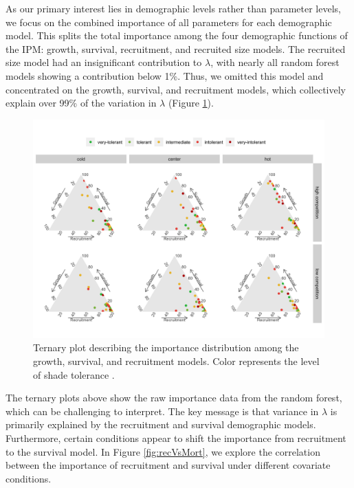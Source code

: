 As our primary interest lies in demographic levels rather than parameter
levels, we focus on the combined importance of all parameters for each
demographic model. This splits the total importance among the four
demographic functions of the IPM: growth, survival, recruitment, and
recruited size models. The recruited size model had an insignificant
contribution to \(\lambda\), with nearly all random forest models
showing a contribution below 1\%. Thus, we omitted this model and
concentrated on the growth, survival, and recruitment models, which
collectively explain over 99\% of the variation in \(\lambda\) (Figure
\ref{fig:ternaryLambda}).\\

\hypertarget{fig:ternaryLambda}{%
\begin{figure}
\centering
\includegraphics{manuscript/figs/fig-ternaryLambda-1.png}
\caption[{Ternary plot describing the importance distribution among the
growth, survival, and recruitment models.}]{Ternary plot describing the
importance distribution among the growth, survival, and recruitment
models. Color represents the level of shade tolerance
\citep{burns1990silvics}.}
\label{fig:ternaryLambda}
\end{figure}
}

The ternary plots above show the raw importance data from the random
forest, which can be challenging to interpret. The key message is that
variance in \(\lambda\) is primarily explained by the recruitment and
survival demographic models. Furthermore, certain conditions appear to
shift the importance from recruitment to the survival model. In Figure
\ref{fig:recVsMort}, we explore the correlation between the importance
of recruitment and survival under different covariate conditions.\\


